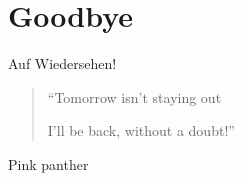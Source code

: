 \AtBeginPart{}
\AtBeginSection{}
\part{Goodbye}
\begin{frame}[c]{Auf Wiedersehen!}
  \begin{minipage}{0.6\linewidth}
    \begin{quote}
      ``Tomorrow isn't staying out\par
      \phantom{``}I'll be back, without a doubt!''
    \end{quote}
    \hfill Pink panther
  \end{minipage}
\end{frame}
%
